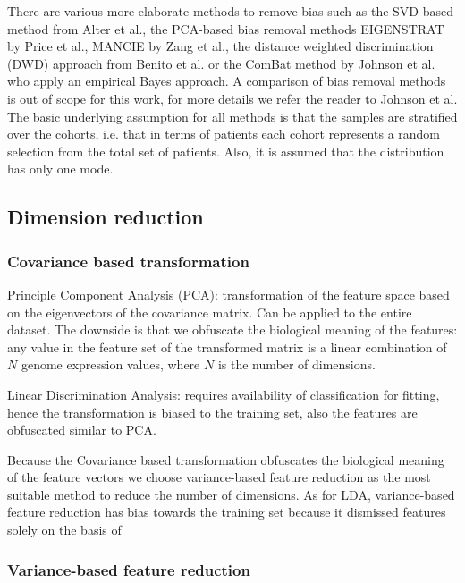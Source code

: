 \documentclass[a4paper,10pt]{article}
\begin{document}
%
There are various more elaborate methods to remove bias such as the SVD-based method from Alter et al.\cite{Alter2000}, the 
PCA-based bias removal methods EIGENSTRAT by Price et al.\cite{Price2006}, MANCIE by Zang et al.\cite{Zang2016}, the distance weighted discrimination (DWD)
approach from Benito et al.\cite{Benito2005} or the ComBat method by Johnson et al.\cite{Johnson2007} who apply an empirical Bayes approach. 
A comparison of bias removal methods is out of scope for this work, for more details we refer the reader to Johnson et al\cite{Johnson2007}.
The basic underlying assumption for all methods is that the samples are stratified over the cohorts, i.e. that in terms
of patients each cohort represents a random selection from the total set of patients. Also, it is assumed that 
the distribution has only one mode.

\subsection{Dimension reduction}
\subsubsection{Covariance based transformation}


Principle Component Analysis (PCA): transformation of the feature space based on the eigenvectors 
of the covariance matrix. Can be applied to the entire dataset.  The downside is that we obfuscate the 
biological meaning of the features: any value in the feature set of the transformed matrix is a linear combination 
of $N$ genome expression values, where $N$ is the number of dimensions. 

Linear Discrimination Analysis: requires availability of classification for fitting, hence
the transformation is biased to the training set, also the features are obfuscated similar to PCA.

Because the Covariance based transformation obfuscates the biological meaning of the feature vectors 
we choose variance-based feature reduction as the most suitable method to reduce the number of dimensions.
As for LDA, variance-based feature reduction has bias towards the training set because it dismissed features solely
on the basis of 

\subsubsection{Variance-based feature reduction}
\end{document}
